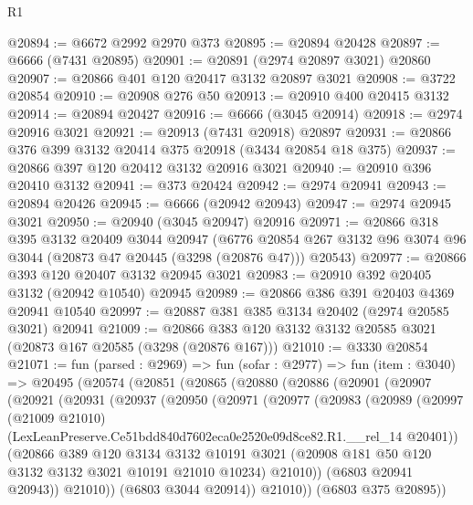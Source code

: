 \begin{lexlean}{R1}
\begin{coremodule}
@20894 := @6672 @2992 @2970 @373
@20895 := @20894 @20428
@20897 := @6666 (@7431 @20895)
@20901 := @20891 (@2974 @20897 @3021) @20860
@20907 := @20866 @401 @120 @20417 @3132 @20897 @3021
@20908 := @3722 @20854
@20910 := @20908 @276 @50
@20913 := @20910 @400 @20415 @3132
@20914 := @20894 @20427
@20916 := @6666 (@3045 @20914)
@20918 := @2974 @20916 @3021
@20921 := @20913 (@7431 @20918) @20897
@20931 := @20866 @376 @399 @3132 @20414 @375 @20918 (@3434 @20854 @18 @375)
@20937 := @20866 @397 @120 @20412 @3132 @20916 @3021
@20940 := @20910 @396 @20410 @3132
@20941 := @373 @20424
@20942 := @2974 @20941
@20943 := @20894 @20426
@20945 := @6666 (@20942 @20943)
@20947 := @2974 @20945 @3021
@20950 := @20940 (@3045 @20947) @20916
@20971 := @20866
    @318
    @395
    @3132
    @20409
    @3044
    @20947
    (@6776 @20854 @267 @3132 @96 @3074 @96 @3044 (@20873 @47 @20445 (@3298 (@20876 @47))) @20543)
@20977 := @20866 @393 @120 @20407 @3132 @20945 @3021
@20983 := @20910 @392 @20405 @3132 (@20942 @10540) @20945
@20989 := @20866 @386 @391 @20403 @4369 @20941 @10540
@20997 := @20887 @381 @385 @3134 @20402 (@2974 @20585 @3021) @20941
@21009 := @20866 @383 @120 @3132 @3132 @20585 @3021 (@20873 @167 @20585 (@3298 (@20876 @167)))
@21010 := @3330 @20854
@21071 := fun (parsed : @2969) =>
  fun (sofar : @2977) =>
  fun (item : @3040) =>
  @20495
    (@20574
      (@20851
        (@20865
          (@20880
            (@20886
              (@20901
                (@20907
                  (@20921
                    (@20931
                      (@20937
                        (@20950
                          (@20971
                            (@20977
                              (@20983
                                (@20989
                                  (@20997
                                    (@21009 @21010)
                                    (LexLeanPreserve.Ce51bdd840d7602eca0e2520e09d8ce82.R1.__rel_14
                                      @20401))
                                  (@20866
                                    @389
                                    @120
                                    @3134
                                    @3132
                                    @10191
                                    @3021
                                    (@20908 @181 @50 @120 @3132 @3132 @3021 @10191 @21010 @10234)
                                    @21010))
                                (@6803 @20941 @20943))
                              @21010))
                          (@6803 @3044 @20914))
                        @21010))
                    (@6803 @375 @20895))

\end{coremodule}
\end{lexlean}
